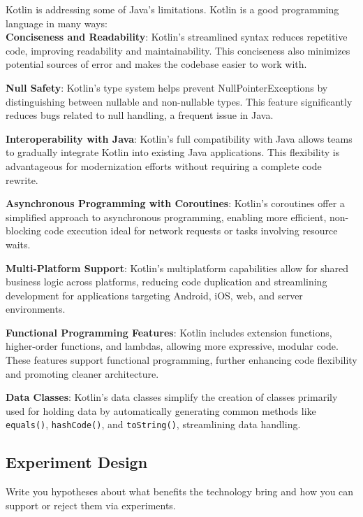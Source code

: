 \vspace{1cm}

Kotlin is addressing some of Java's limitations. Kotlin is a good programming language in many ways:
\\
\textbf{Conciseness and Readability}: Kotlin’s streamlined syntax reduces repetitive code, improving readability and maintainability. This conciseness also minimizes potential sources of error and makes the codebase easier to work with.

\textbf{Null Safety}: Kotlin’s type system helps prevent NullPointerExceptions by distinguishing between nullable and non-nullable types. This feature significantly reduces bugs related to null handling, a frequent issue in Java.

\textbf{Interoperability with Java}: Kotlin’s full compatibility with Java allows teams to gradually integrate Kotlin into existing Java applications. This flexibility is advantageous for modernization efforts without requiring a complete code rewrite.

\textbf{Asynchronous Programming with Coroutines}: Kotlin’s coroutines offer a simplified approach to asynchronous programming, enabling more efficient, non-blocking code execution ideal for network requests or tasks involving resource waits.

\textbf{Multi-Platform Support}: Kotlin’s multiplatform capabilities allow for shared business logic across platforms, reducing code duplication and streamlining development for applications targeting Android, iOS, web, and server environments.

\textbf{Functional Programming Features}: Kotlin includes extension functions, higher-order functions, and lambdas, allowing more expressive, modular code. These features support functional programming, further enhancing code flexibility and promoting cleaner architecture.

\textbf{Data Classes}: Kotlin’s data classes simplify the creation of classes primarily used for holding data by automatically generating common methods like \texttt{equals()}, \texttt{hashCode()}, and \texttt{toString()}, streamlining data handling.


\subsection{Experiment Design}

Write you hypotheses about what benefits the technology bring and how you can support or reject them via experiments.


